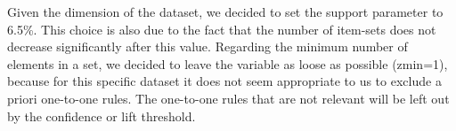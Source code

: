 \documentclass[a4paper,11pt,dvipsnames]{article}
\begin{document}
Given the dimension of the dataset, we decided to set the support parameter to 6.5\%. This choice is also due to the fact that the number of item-sets does not decrease significantly after this value.
Regarding the minimum number of elements in a set, we decided to leave the variable as loose as possible (zmin=1), because for this specific dataset it does not seem appropriate to us to exclude a priori one-to-one rules. The one-to-one rules that are not relevant will be left out by the confidence or lift threshold. 

\begin{minipage}{0.48\linewidth}

\begin{table}[H]
    \centering
   
        \caption{Number of rules by confidence and lift} \label{tab:par_rules}

\end{table}
\end{minipage}
\hfil
\end{document}
